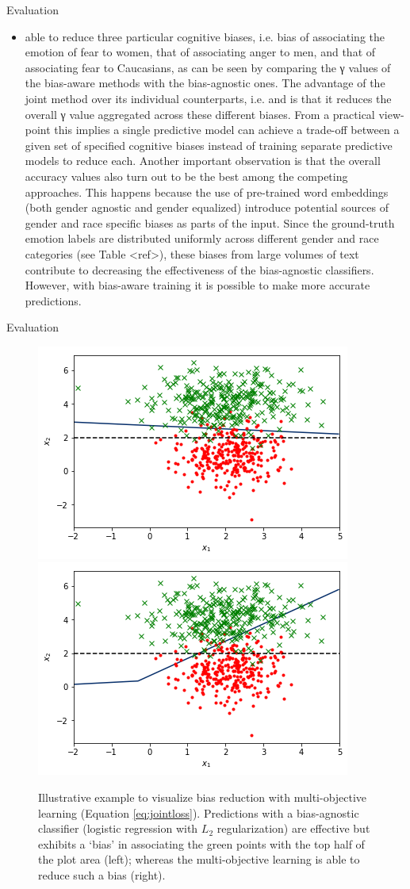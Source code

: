 \documentclass{beamer}
\begin{document}
\begin{frame}{Evaluation}
\begin{itemize}
\item
able to reduce three particular cognitive biases, i.e. bias of associating the emotion of fear to women, that of associating anger to men, and that of associating fear to Caucasians, as can be seen by comparing the γ values of the bias-aware methods with the bias-agnostic ones. The advantage of the joint method over its individual counterparts, i.e. and is that it reduces the overall γ value aggregated across these different biases. From a practical view-point this implies a single predictive model can achieve a trade-off between a given set of specified cognitive biases instead of training separate predictive models to reduce each. Another important observation is that the overall accuracy values also turn out to be the best among the competing approaches. This happens because the use of pre-trained word embeddings (both gender agnostic and gender equalized) introduce potential sources of gender and race specific biases as parts of the input. Since the ground-truth emotion labels are distributed uniformly across different gender and race categories (see Table <ref>), these biases from large volumes of text contribute to decreasing the effectiveness of the bias-agnostic classifiers. However, with bias-aware training it is possible to make more accurate predictions.
\end{itemize}
\end{frame}
%
\begin{frame}{Evaluation}
%
\begin{figure}[t]
\centering
\includegraphics[width=0.49\columnwidth]{biased_boundary.png}
\includegraphics[width=0.49\columnwidth]{debiased_boundary.png}
\caption{Illustrative example to visualize bias reduction with multi-objective learning (Equation \ref{eq:jointloss}). Predictions
with a bias-agnostic classifier (logistic regression with $L_2$ regularization) are effective but exhibits a `bias' in associating the green points with the top half of the plot area (left); whereas the multi-objective learning is able to reduce such a bias (right).
\label{fig:2d-data}}
\end{figure}
\end{frame}
\end{document}
